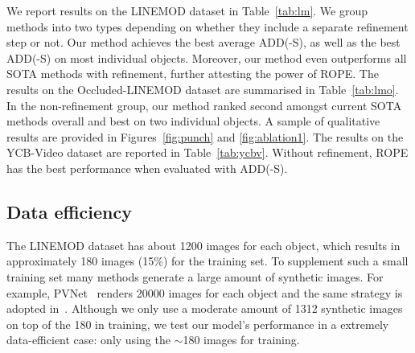 \documentclass[10pt,twocolumn,letterpaper]{article}
\begin{document}
We report results on the LINEMOD dataset in Table~\ref{tab:lm}. We group methods into two types depending on whether they include a separate refinement step or not. Our method achieves the best average ADD(-S),  as well as the best ADD(-S) on most individual objects. Moreover, our method even outperforms all SOTA methods with refinement, further attesting the power of ROPE.  
The results on the Occluded-LINEMOD dataset are summarised in Table~\ref{tab:lmo}. In the non-refinement group, our method ranked second amongst current SOTA methods overall and best on two individual objects. A sample of qualitative results are provided in Figures~\ref{fig:punch} and \ref{fig:ablation1}.
The results on the YCB-Video dataset are reported in Table~\ref{tab:ycbv}. Without refinement, ROPE has the best performance when evaluated with ADD(-S). 

\subsection{Data efficiency}
The LINEMOD dataset has about 1200 images for each object, which results in approximately 180 images (15\%) for the training set. To supplement such a small training set many methods generate a large amount of synthetic images. For example, 
PVNet~\cite{Peng2019pvnet} renders 20000 images for each object and the same strategy is adopted in~\cite{song2020hybridposev4}. Although we only use a moderate amount of 1312 synthetic images on top of the 180 in training, we test our model's performance in a extremely data-efficient case: only using the $\sim$180 images for training. 
\end{document}
